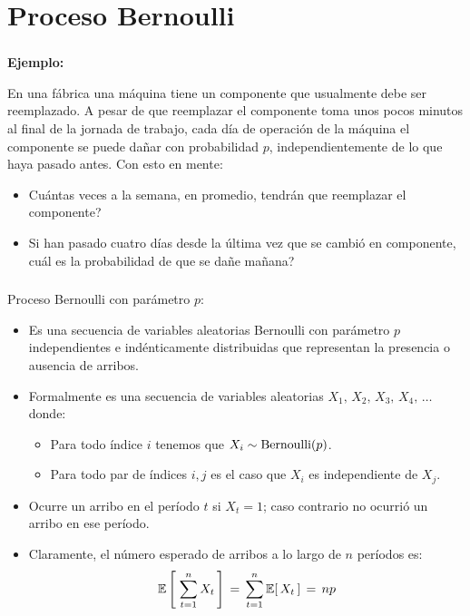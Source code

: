\documentclass[ 10pt, xcolor = dvipsnames]{beamer}
\begin{document}
\section{Proceso Bernoulli}

\begin{frame}[allowframebreaks]
\frametitle{\insertsection}

\textbf{Ejemplo:}

En una f\'abrica una m\'aquina tiene un componente que usualmente debe ser reemplazado. A pesar de que reemplazar el componente toma unos pocos minutos al final de la jornada de trabajo, cada d\'ia de operaci\'on de la m\'aquina el componente se puede da\~nar con probabilidad $p$, independientemente de lo que haya pasado antes. Con esto en mente: 
\begin{itemize}
\item Cu\'antas veces a la semana, en promedio, tendr\'an que reemplazar el componente? 
\item Si han pasado cuatro d\'ias desde la \'ultima vez que se cambi\'o en componente, cu\'al es la probabilidad de que se da\~ne ma\~nana? 
\end{itemize}

\end{frame}

\begin{frame}[allowframebreaks]
\frametitle{\insertsection}

Proceso Bernoulli con par\'ametro $p$: 
\begin{itemize}
\item Es una secuencia de variables aleatorias Bernoulli con par\'ametro $p$ independientes e ind\'enticamente distribuidas que representan la \linebreak presencia o ausencia de arribos. 
\item Formalmente es una secuencia de variables aleatorias $X_1, \, X_2, \, X_3, \, X_4, \, \dots$ donde: 
\begin{itemize}
\item Para todo \'indice $i$ tenemos que $X_i \sim \text{Bernoulli}(p)$. 
\item Para todo par de \'indices $i,j$ es el caso que $X_i$ es independiente de $X_j$. 
\end{itemize}
\item Ocurre un arribo en el per\'iodo $t$ si $X_t = 1$; caso contrario no ocurri\'o un arribo en ese per\'iodo. 
\item Claramente, el n\'umero esperado de arribos a lo largo de $n$ per\'iodos es: 
\[
\mathbb{E} \left[ \; \sum_{t=1}^n X_t \, \right] \, = \,
\sum_{t=1}^n \mathbb{E}[ \, X_t \, ] \, = \, n p
\]
\end{itemize}

\end{frame}
\end{document}
